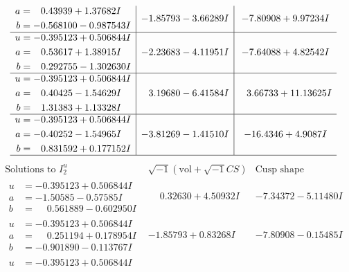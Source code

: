 \documentclass[1p]{elsarticle_modified}
\theoremstyle{definition}
\newcommand{\I}{\sqrt{-1}}
\begin{document}
$$\begin{array}{c|c|c}
\begin{aligned}
a &= \phantom{-}0.43939 + 1.37682 I \\
b &= -0.568100 - 0.987543 I\end{aligned}
 & -1.85793 - 3.66289 I & -7.80908 + 9.97234 I \\ \hline\begin{aligned}
u &= -0.395123 + 0.506844 I \\
a &= \phantom{-}0.53617 + 1.38915 I \\
b &= \phantom{-}0.292755 - 1.302630 I\end{aligned}
 & -2.23683 - 4.11951 I & -7.64088 + 4.82542 I \\ \hline\begin{aligned}
u &= -0.395123 + 0.506844 I \\
a &= \phantom{-}0.40425 - 1.54629 I \\
b &= \phantom{-}1.31383 + 1.13328 I\end{aligned}
 & \phantom{-}3.19680 - 6.41584 I & \phantom{-}3.66733 + 11.13625 I \\ \hline\begin{aligned}
u &= -0.395123 + 0.506844 I \\
a &= -0.40252 - 1.54965 I \\
b &= \phantom{-}0.831592 + 0.177152 I\end{aligned}
 & -3.81269 - 1.41510 I & -16.4346 + 4.9087 I\\
 \hline 
 \end{array}$$\newpage$$\begin{array}{c|c|c}  
\text{Solutions to }I^u_{2}& \I (\text{vol} + \sqrt{-1}CS) & \text{Cusp shape}\\
 \hline 
\begin{aligned}
u &= -0.395123 + 0.506844 I \\
a &= -1.50585 - 0.57585 I \\
b &= \phantom{-}0.561889 - 0.602950 I\end{aligned}
 & \phantom{-}0.32630 + 4.50932 I & -7.34372 - 5.11480 I \\ \hline\begin{aligned}
u &= -0.395123 + 0.506844 I \\
a &= \phantom{-}0.251194 + 0.178954 I \\
b &= -0.901890 - 0.113767 I\end{aligned}
 & -1.85793 + 0.83268 I & -7.80908 - 0.15485 I \\ \hline\begin{aligned}
u &= -0.395123 + 0.506844 I \\

\end{aligned}
\end{array}$$
\end{document}
